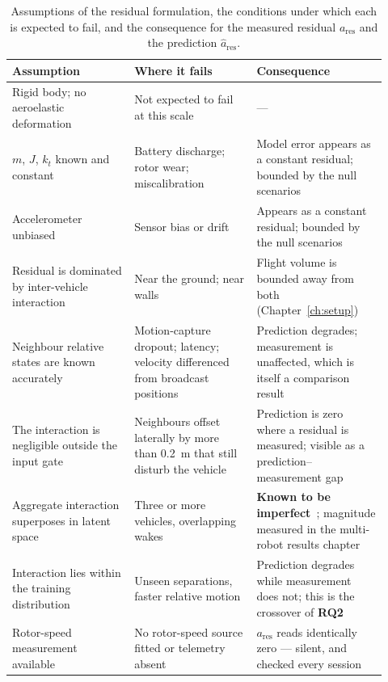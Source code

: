 \begin{table}[t]
  \centering
  \caption{Assumptions of the residual formulation, the conditions under which each is expected to
    fail, and the consequence for the measured residual $a_{\mathrm{res}}$ and the prediction
    $\hat a_{\mathrm{res}}$.}
  \label{tab:model-assumptions}
  \small
  \begin{tabular}{@{}p{0.30\linewidth}p{0.30\linewidth}p{0.32\linewidth}@{}}
    \toprule
    Assumption & Where it fails & Consequence \\
    \midrule
    Rigid body; no aeroelastic deformation
      & Not expected to fail at this scale
      & --- \\
    $m$, $J$, $k_t$ known and constant
      & Battery discharge; rotor wear; miscalibration
      & Model error appears as a constant residual; bounded by the null scenarios \\
    Accelerometer unbiased
      & Sensor bias or drift
      & Appears as a constant residual; bounded by the null scenarios \\
    Residual is dominated by inter-vehicle interaction
      & Near the ground; near walls
      & Flight volume is bounded away from both (Chapter~\ref{ch:setup}) \\
    Neighbour relative states are known accurately
      & Motion-capture dropout; latency; velocity differenced from broadcast positions
      & Prediction degrades; measurement is unaffected, which is itself a comparison result \\
    The interaction is negligible outside the input gate
      & Neighbours offset laterally by more than \SI{0.2}{\metre} that still disturb the vehicle
      & Prediction is zero where a residual is measured; visible as a prediction--measurement gap \\
    Aggregate interaction superposes in latent space
      & Three or more vehicles, overlapping wakes
      & \textbf{Known to be imperfect}~\cite{shi2020neuralswarm,gielis2023aggregate}; magnitude measured in the multi-robot results chapter \\
    Interaction lies within the training distribution
      & Unseen separations, faster relative motion
      & Prediction degrades while measurement does not; this is the crossover of \textbf{RQ2} \\
    Rotor-speed measurement available
      & No rotor-speed source fitted or telemetry absent
      & $a_{\mathrm{res}}$ reads identically zero --- silent, and checked every session \\
    \bottomrule
  \end{tabular}
\end{table}

